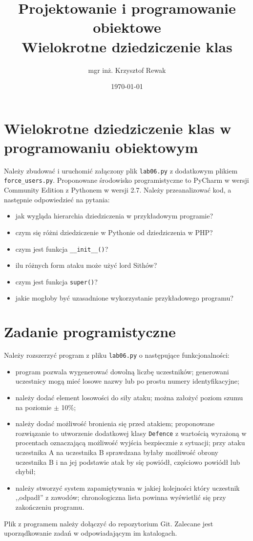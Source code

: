 \documentclass{article}
\title{
	Projektowanie i programowanie obiektowe \\
	\Huge{Wielokrotne dziedziczenie klas}
}
\author{mgr inż. Krzysztof Rewak}
\date{\today}
\begin{document}
	\maketitle

	\section{Wielokrotne dziedziczenie klas w programowaniu obiektowym}
	Należy zbudować i uruchomić załączony plik \texttt{lab06.py} z dodatkowym plikiem \texttt{force\_users.py}. Proponowane środowisko programistyczne to PyCharm w wersji Community Edition z Pythonem w wersji 2.7. Należy przeanalizować kod, a następnie odpowiedzieć na pytania:
	\begin{itemize}
		\item jak wygląda hierarchia dziedziczenia w przykładowym programie?
		\item czym się różni dziedziczenie w Pythonie od dziedziczenia w PHP?
		\item czym jest funkcja \texttt{\_\_init\_\_()}?
		\item ilu różnych form ataku może użyć lord Sithów?
		\item czym jest funkcja \texttt{super()}?
		\item jakie mogłoby być uzasadnione wykorzystanie przykładowego programu?
	\end{itemize}

	\section{Zadanie programistyczne}
	Należy rozszerzyć program z pliku \texttt{lab06.py} o następujące funkcjonalności:
	\begin{itemize}
		\item program pozwala wygenerować dowolną liczbę uczestników; generowani uczestnicy mogą mieć losowe nazwy lub po prostu numery identyfikacyjne; 
		\item należy dodać element losowości do siły ataku; można założyć poziom szumu na poziomie $\pm$ 10\%;
		\item należy dodać możliwość bronienia się przed atakiem; proponowane rozwiązanie to utworzenie dodatkowej klasy \texttt{Defence} z wartością wyrażoną w procentach oznaczającą możliwość wyjścia bezpiecznie z sytuacji; przy ataku uczestnika A na uczestnika B sprawdzana byłaby możliwość obrony uczestnika B i na jej podstawie atak by się powiódł, częściowo powiódł lub chybił;
		\item należy stworzyć system zapamiętywania w jakiej kolejności który uczestnik ,,odpadł'' z zawodów; chronologiczna lista powinna wyświetlić się przy zakończeniu programu.
	\end{itemize}
	
	Plik z programem należy dołączyć do repozytorium Git. Zalecane jest uporządkowanie zadań w odpowiadającym im katalogach.
\end{document}

